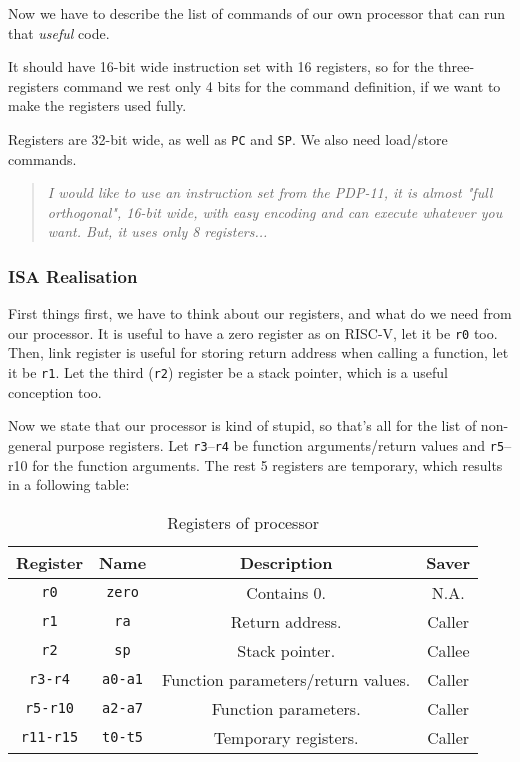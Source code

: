 \documentclass[a4paper]{article}
\begin{document}
Now we have to describe the list of commands of our own processor that can run that \textit{useful} code.

It should have 16-bit wide instruction set with 16 registers, so for the three-registers command we rest only 4 bits for the command definition, if we want to make the registers used fully.

Registers are 32-bit wide, as well as \texttt{PC} and \texttt{SP}. We also need load/store commands.

\begin{quote}
\textit{ I would like to use an instruction set from the PDP-11, it is almost "full orthogonal", 16-bit wide, with easy encoding and can execute whatever you want. But, it uses only 8 registers... }
\end{quote}

\subsubsection{ISA Realisation}
First things first, we have to think about our registers, and what do we need from our processor.
It is useful to have a zero register as on RISC-V, let it be \texttt{r0} too.
Then, link register is useful for storing return address when calling a function, let it be \texttt{r1}.
Let the third (\texttt{r2}) register be a stack pointer, which is a useful conception too.

Now we state that our processor is kind of stupid, so that's all for the list of non-general purpose registers. Let \texttt{r3}--\texttt{r4} be function arguments/return values and \texttt{r5}--{r10} for the function arguments. The rest 5 registers are temporary, which results in a following table:

\begin{table}[!h]
    \centering
    \caption{Registers of processor}
    \begin{tabular}{c c c c}
         Register & Name & Description & Saver\\ \hline \hline
         \texttt{r0} & \texttt{zero} & Contains 0. & N.A. \\ 
         \texttt{r1} & \texttt{ra} & Return address. & Caller \\ 
         \texttt{r2} & \texttt{sp} & Stack pointer. & Callee \\ 
         \texttt{r3-r4} & \texttt{a0-a1} & Function parameters/return values. & Caller \\ 
         \texttt{r5-r10} & \texttt{a2-a7} & Function parameters. & Caller \\ 
         \texttt{r11-r15} & \texttt{t0-t5} & Temporary registers. & Caller \\ 
         
    \end{tabular}
\end{table}
\end{document}
